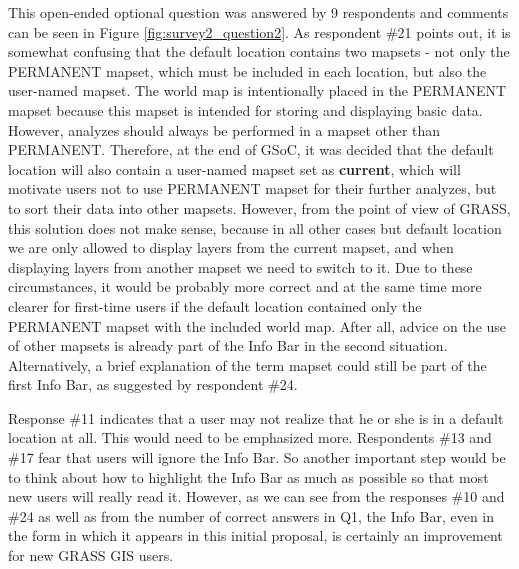 \documentclass[a4paper,10pt,twoside]{article}
\begin{document}
\noindent This open-ended optional question was answered by 9 respondents and comments can be seen in Figure \ref{fig:survey2_question2}. As respondent \#21 points out, it is somewhat confusing that the default location contains two mapsets - not only the PERMANENT mapset, which must be included in each location, but also the user-named mapset. The world map is intentionally placed in the PERMANENT mapset because this mapset is intended for storing and displaying basic data. However, analyzes should always be performed in a mapset other than PERMANENT. Therefore, at the end of GSoC, it was decided that the default location will also contain a user-named mapset set as \textbf{current}, which will motivate users not to use PERMANENT mapset for their further analyzes, but to sort their data into other mapsets. However, from the point of view of GRASS, this solution does not make sense, because in all other cases but default location we are only allowed to display layers from the current mapset, and when displaying layers from another mapset we need to switch to it. Due to these circumstances, it would be probably more correct and at the same time more clearer for first-time users if the default location contained only the PERMANENT mapset with the included world map. After all, advice on the use of other mapsets is already part of the Info Bar in the second situation. Alternatively, a brief explanation of the term mapset could still be part of the first Info Bar, as suggested by respondent \#24.

Response \#11 indicates that a user may not realize that he or she is in a default location at all. This would need to be emphasized more. Respondents \#13 and \#17 fear that users will ignore the Info Bar. So another important step would be to think about how to highlight the Info Bar as much as possible so that most new users will really read it. However, as we can see from the responses \#10 and \#24 as well as from the number of correct answers in Q1, the Info Bar, even in the form in which it appears in this initial proposal, is certainly an improvement for new GRASS GIS users.
\end{document}
